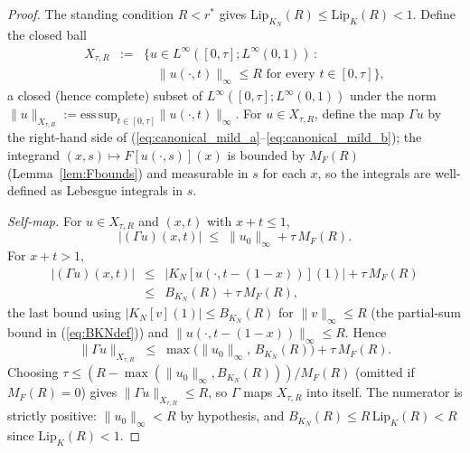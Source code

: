 \documentclass[10pt,a4paper]{amsart}
\newcommand{\Linf}{L^\infty}
\newcommand{\Lipk}{\mathrm{Lip}_K}
\newcommand{\LipKn}{\mathrm{Lip}_{K_N}}
\begin{document}
\begin{proof}
The standing condition $R < r^*$ gives $\LipKn(R) \le \Lipk(R) < 1$. Define the closed ball
\begin{eqnarray}
X_{\tau, R} &:=& \bigl\{u \in \Linf([0,\tau]; \Linf(0,1)) \,:\, \nonumber \\
&& \quad \|u(\cdot, t)\|_\infty \le R \text{ for every } t \in [0,\tau]\bigr\},
\label{eq:Xtau}
\end{eqnarray}
a closed (hence complete) subset of $\Linf([0,\tau]; \Linf(0,1))$ under the norm $\|u\|_{X_{\tau,R}} := \mathrm{ess\,sup}_{t \in [0,\tau]}\|u(\cdot, t)\|_\infty$. For $u \in X_{\tau, R}$, define the map $\Gamma u$ by the right-hand side of (\ref{eq:canonical_mild_a}--\ref{eq:canonical_mild_b}); the integrand $(x, s) \mapsto F[u(\cdot, s)](x)$ is bounded by $M_F(R)$ (Lemma~\ref{lem:Fbounds}) and measurable in $s$ for each $x$, so the integrals are well-defined as Lebesgue integrals in $s$.

\emph{Self-map.} For $u \in X_{\tau, R}$ and $(x, t)$ with $x + t \le 1$,
\begin{equation}
|(\Gamma u)(x, t)| \;\le\; \|u_0\|_\infty + \tau\, M_F(R).
\label{eq:Gamma_interior}
\end{equation}
For $x + t > 1$,
\begin{eqnarray}
|(\Gamma u)(x, t)| &\le& |K_N[u(\cdot, t - (1-x))](1)| + \tau\, M_F(R) \nonumber \\
&\le& B_{K_N}(R) + \tau\, M_F(R),
\label{eq:Gamma_boundary}
\end{eqnarray}
the last bound using $|K_N[v](1)| \le B_{K_N}(R)$ for $\|v\|_\infty \le R$ (the partial-sum bound in (\ref{eq:BKNdef})) and $\|u(\cdot, t-(1-x))\|_\infty \le R$. Hence
\begin{equation}
\|\Gamma u\|_{X_{\tau, R}} \;\le\; \max\bigl(\|u_0\|_\infty,\, B_{K_N}(R)\bigr) + \tau\, M_F(R).
\label{eq:Gamma_selfmap_bound}
\end{equation}
Choosing $\tau \le (R - \max(\|u_0\|_\infty, B_{K_N}(R)))/M_F(R)$ (omitted if $M_F(R) = 0$) gives $\|\Gamma u\|_{X_{\tau, R}} \le R$, so $\Gamma$ maps $X_{\tau, R}$ into itself. The numerator is strictly positive: $\|u_0\|_\infty < R$ by hypothesis, and $B_{K_N}(R) \le R\, \Lipk(R) < R$ since $\Lipk(R) < 1$.


\end{proof}
\end{document}
